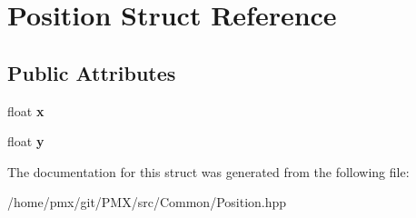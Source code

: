 \hypertarget{structPosition}{}\section{Position Struct Reference}
\label{structPosition}
\subsection*{Public Attributes}
\begin{DoxyCompactItemize}
\item 
\mbox{\label{structPosition_af684446cbf0f6d53386686283da6dcc6}} 
float {\bfseries x}
\item 
\mbox{\label{structPosition_a54a6182b5f7539295b32255808897d3f}} 
float {\bfseries y}
\end{DoxyCompactItemize}


The documentation for this struct was generated from the following file\+:\begin{DoxyCompactItemize}
\item 
/home/pmx/git/\+P\+M\+X/src/\+Common/Position.\+hpp\end{DoxyCompactItemize}
